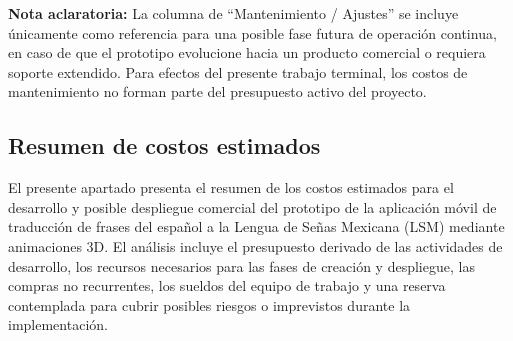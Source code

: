 \noindent \textbf{Nota aclaratoria:}  
La columna de “Mantenimiento / Ajustes” se incluye únicamente como referencia para una posible fase futura de operación continua, en caso de que el prototipo evolucione hacia un producto comercial o requiera soporte extendido. Para efectos del presente trabajo terminal, los costos de mantenimiento no forman parte del presupuesto activo del proyecto.


\subsection{Resumen de costos estimados}

El presente apartado presenta el resumen de los costos estimados para el desarrollo y posible despliegue comercial del prototipo de la aplicación móvil de traducción de frases del español a la Lengua de Señas Mexicana (LSM) mediante animaciones 3D. El análisis incluye el presupuesto derivado de las actividades de desarrollo, los recursos necesarios para las fases de creación y despliegue, las compras no recurrentes, los sueldos del equipo de trabajo y una reserva contemplada para cubrir posibles riesgos o imprevistos durante la implementación.

\begin{table}[H]
	\centering
	\renewcommand{\arraystretch}{1.5}
	\setlength{\tabcolsep}{12pt}
	\caption{Resumen de costos estimados para el desarrollo y despliegue del prototipo}
	\label{tab:costos}
\end{table}

